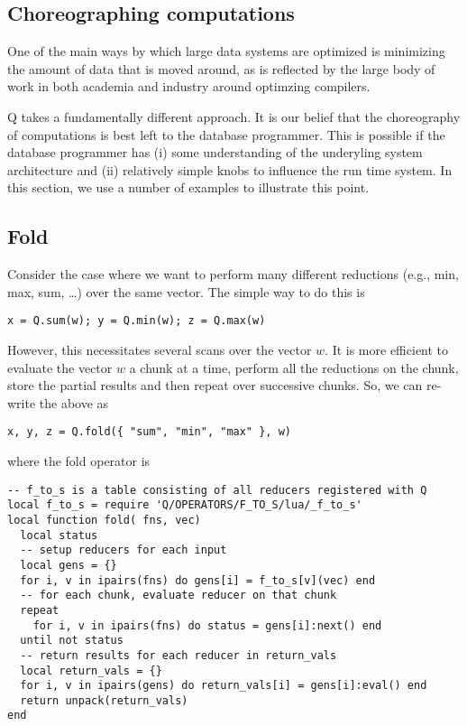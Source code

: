 \subsection{Choreographing computations}

One of the main ways by which large data systems are optimized is minimizing the
amount of data that is moved around, as is reflected by the large body of work in
both academia and industry around optimzing compilers. 

Q takes a fundamentally different approach. It is our belief that the
choreography of computations is best left to the database programmer. This is
possible if the database programmer has (i) some understanding of the underyling
system architecture and (ii) relatively simple knobs to influence the run time
system.  In this section, we use a number of examples to illustrate this point.


\subsection{Fold}
Consider the case where we want to perform many different reductions (e.g., min,
max, sum, \ldots) over the same vector. The simple way to do this is
\begin{verbatim}
x = Q.sum(w); y = Q.min(w); z = Q.max(w)
\end{verbatim}
However, this necessitates several scans over the vector \(w\). It is more
efficient to evaluate the vector \(w\) a chunk at a time, perform all the
reductions on the chunk, store the partial results and then repeat over
successive chunks. So, we can re-write the above as 

\begin{verbatim}
x, y, z = Q.fold({ "sum", "min", "max" }, w)
\end{verbatim}
where the fold operator is 
\begin{verbatim}
-- f_to_s is a table consisting of all reducers registered with Q
local f_to_s = require 'Q/OPERATORS/F_TO_S/lua/_f_to_s'
local function fold( fns, vec)
  local status
  -- setup reducers for each input 
  local gens = {} 
  for i, v in ipairs(fns) do gens[i] = f_to_s[v](vec) end
  -- for each chunk, evaluate reducer on that chunk
  repeat 
    for i, v in ipairs(fns) do status = gens[i]:next() end 
  until not status
  -- return results for each reducer in return_vals
  local return_vals = {}
  for i, v in ipairs(gens) do return_vals[i] = gens[i]:eval() end
  return unpack(return_vals)
end
\end{verbatim}
